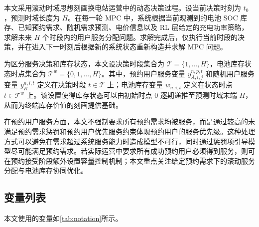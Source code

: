 \documentclass[12pt,hyperref,a4paper,UTF8]{ctexart}
\begin{document}
本文采用滚动时域思想刻画换电站运营中的动态决策过程。设当前决策时刻为 $t_0$，预测时域长度为 $H$。在每一轮 MPC 中，系统根据当前观测到的电池 SOC 库存、已知预约需求、随机需求预测、电价信息以及 RL 层给定的充电功率策略，求解未来 $H$ 个时段内的用户服务分配问题。求解完成后，仅执行当前时段的决策，并在进入下一时刻后根据新的系统状态重新构造并求解 MPC 问题。

为区分服务决策和库存状态，本文设决策时段集合为 $\mathcal{T}=\{1,\ldots,H\}$，电池库存状态时点集合为 $\mathcal{T}^{w}=\{0,1,\ldots,H\}$。其中，预约用户服务变量 $y_{A,i,j}^{n,p,t}$ 和随机用户服务变量 $y_R^{n,i,t}$ 定义在决策时段 $t\in\mathcal{T}$ 上；电池库存变量 $w_{n,i,t}$ 定义在状态时点 $t\in\mathcal{T}^{w}$ 上。该设置使得库存状态可以由初始时点 $0$ 逐期递推至预测时域末端 $H$，从而为终端库存价值的刻画提供基础。

在预约用户服务方面，本文不强制要求所有预约需求均被服务，而是通过较高的未满足预约需求惩罚和预约用户优先服务约束体现预约用户的服务优先级。这种处理方式可以避免在需求超过系统服务能力时造成模型不可行，同时通过惩罚项引导模型尽可能满足预约需求。若实际运营中要求所有成功预约用户必须得到服务，则可在预约接受阶段额外设置容量控制机制；本文重点关注给定预约需求下的滚动服务分配与电池库存协同优化。

\subsection{变量列表}

本文使用的变量如\autoref{tab:notation}所示。
\end{document}
